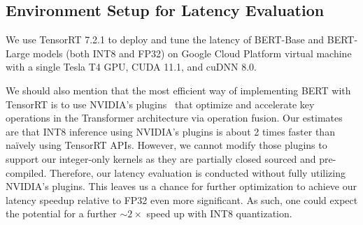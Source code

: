 \subsection{Environment Setup for Latency Evaluation}
\label{appendix:env_setup}

We use TensorRT 7.2.1 to deploy and tune the latency of BERT-Base and BERT-Large models (both INT8 and FP32) on Google Cloud Platform virtual machine with a single Tesla T4 GPU, CUDA 11.1, and cuDNN 8.0. 

We should also mention that the
 most efficient way of implementing BERT with TensorRT is to use NVIDIA's plugins~\cite{tensorrtbert} that optimize and accelerate key operations in the Transformer architecture via operation fusion. 
Our estimates are that INT8 inference using NVIDIA's plugins is about 2 times faster than
na\"ively using TensorRT APIs.
However, we cannot modify those plugins to support our integer-only kernels as they are partially closed sourced and pre-compiled. 
Therefore, our latency evaluation is conducted without fully utilizing NVIDIA's plugins. 
This leaves us a chance for further optimization to achieve our latency speedup relative to FP32 even more significant. As such, one could expect the potential for a further $\sim2\times$ speed up with INT8 quantization.
